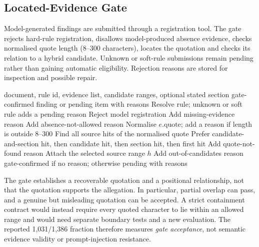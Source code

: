 \documentclass[computers,article,submit,moreauthors]{Definitions/mdpi}
\begin{document}
\subsection{Located-Evidence Gate}\label{sec:gate}

Model-generated findings are submitted through a registration tool. The gate rejects hard-rule registration, disallows model-produced absence evidence, checks normalised quote length (8--300 characters), locates the quotation and checks its relation to a hybrid candidate. Unknown or soft-rule submissions remain pending rather than gaining automatic eligibility. Rejection reasons are stored for inspection and possible repair.

\begin{algo}[H]
\caption{Gate in the evaluated prototype (simplified). Scope membership is overlap, not complete containment; location does not establish entailment.}
\label{alg:gate}
\begin{algorithmic}[1]
\Require document, rule id, evidence list, candidate ranges, optional stated section
\Ensure gate-confirmed finding or pending item with reasons
\State Resolve rule; unknown or soft rule adds a pending reason
 \State Reject model registration \EndIf
{} \State Add missing-evidence reason \EndIf
{}
    \State Add absence-not-allowed reason
  \EndIf
  \State Normalise $e.\text{quote}$; add a reason if length is outside 8--300
  \State Find all source hits of the normalised quote
  \State Prefer candidate-and-section hit, then candidate hit, then section hit, then first hit
   \State Add quote-not-found reason
  \Else
    \State Attach the selected source range $h$
     \State Add out-of-candidates reason \EndIf
  \EndIf
\EndFor
\State \Return gate-confirmed if no reason; otherwise pending with reasons
\end{algorithmic}
\end{algo}

The gate establishes a recoverable quotation and a positional relationship, not that the quotation supports the allegation. In particular, partial overlap can pass, and a genuine but misleading quotation can be accepted. A strict containment contract would instead require every quoted character to lie within an allowed range and would need separate boundary tests and a new evaluation. The reported 1,031/1,386 fraction therefore measures \emph{gate acceptance}, not semantic evidence validity or prompt-injection resistance.
\end{document}
